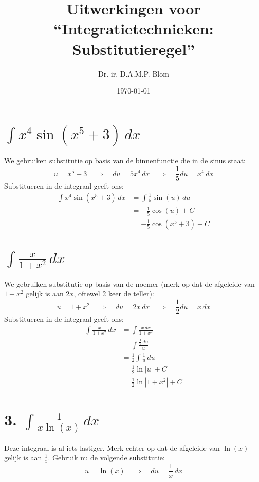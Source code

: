 \documentclass[a4paper,12pt]{article}
\title{Uitwerkingen voor ``Integratietechnieken: Substitutieregel''}
\author{Dr. ir. D.A.M.P. Blom}
\date{\today}
\begin{document}
\maketitle

\section*{$\int x^4 \sin(x^5 + 3)\, dx$}

We gebruiken substitutie op basis van de binnenfunctie die in de sinus staat:
\[
    u = x^5 + 3 \quad \Rightarrow \quad du = 5x^4\, dx \quad \Rightarrow \quad \frac{1}{5}du = x^4\, dx
\]
Substitueren in de integraal geeft ons:
\begin{align*}
    \int x^4 \sin(x^5 + 3)\, dx &= \int \frac{1}{5} \sin(u)\, du \\
                                &= -\frac{1}{5}\cos(u) + C \\
                                &\boxed{=-\frac{1}{5} \cos(x^5 + 3) + C}
\end{align*}

\section*{$\int \frac{x}{1 + x^2}\, dx$}

We gebruiken substitutie op basis van de noemer (merk op dat de afgeleide van $1+x^2$ gelijk is aan $2x$, oftewel 2 keer de teller):
\[
u = 1 + x^2 \quad \Rightarrow \quad du = 2x\, dx \quad \Rightarrow \quad \frac{1}{2}du = x\, dx
\]
Substitueren in de integraal geeft ons:
\begin{align*}
    \int \frac{x}{1 + x^2}\, dx &= \int \frac{x\, dx}{1 + x^2} \\
                                &= \int \frac{\frac{1}{2}\,du}{u} \\
                                &= \frac{1}{2} \int \frac{1}{u}\, du \\
                                &= \frac{1}{2} \ln|u| + C \\
                                &\boxed{=\frac{1}{2} \ln|1 + x^2| + C}
\end{align*}

\section*{3. $\int \frac{1}{x \ln(x)}\, dx$}

Deze integraal is al iets lastiger. Merk echter op dat de afgeleide van $\ln(x)$ gelijk is aan $\frac{1}{x}$.
Gebruik nu de volgende substitutie:
\[
    u = \ln(x) \quad \Rightarrow \quad du = \frac{1}{x}\, dx
\]
\end{document}
